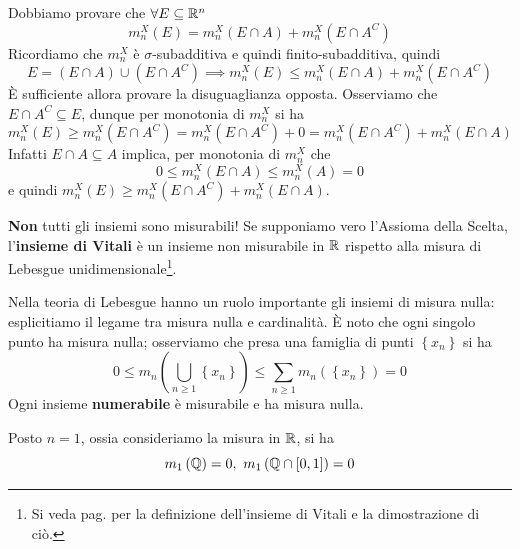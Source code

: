\begin{demonstration}
	Dobbiamo provare che $\forall E\subseteq \mathbb{R}^n$
	\begin{equation*}
		m_n^X(E)=m_n^X\left(E\cap A\right)+m_n^X\left(E\cap A^C\right)
	\end{equation*}
	Ricordiamo che $m_n^X$ è $\sigma$-subadditiva e quindi finito-subadditiva, quindi
	\begin{equation*}
		E=\left(E\cap A\right)\cup \left(E\cap A^C\right)\implies m_n^X(E)\leq m_n^X\left(E\cap A\right)+m_n^X\left(E\cap A^C\right)
	\end{equation*}
	È sufficiente allora provare la disuguaglianza opposta. Osserviamo che $E\cap A^C\subseteq E$, dunque per monotonia di $m_n^X$ si ha
	\begin{equation*}
		m_n^X(E)\geq m_n^X\left(E\cap A^C\right)=m_n^X\left(E\cap A^C\right)+0=m_n^X\left(E\cap A^C\right)+m_n^X\left(E\cap A\right)
	\end{equation*}
	Infatti $E\cap A\subseteq A$ implica, per monotonia di $m_n^X$ che
	\begin{equation*}
		0\leq m_n^X\left(E\cap A\right)\leq m_n^X\left(A\right)=0
	\end{equation*}
	e quindi $m_n^X(E)\geq m_n^X\left(E\cap A^C\right)+m_n^X\left(E\cap A\right)$.
\end{demonstration}
\begin{attention}
	\textbf{Non} tutti gli insiemi sono misurabili! Se supponiamo vero l'Assioma della Scelta, l'\textbf{insieme di Vitali} è un insieme non misurabile in $\mathbb{R}$ rispetto alla misura di Lebesgue unidimensionale\footnote{Si veda pag. \pageref{vitali} per la definizione dell'insieme di Vitali e la dimostrazione di ciò.}.
\end{attention}
Nella teoria di Lebesgue hanno un ruolo importante gli insiemi di misura nulla: esplicitiamo il legame tra misura nulla e cardinalità.
È noto che ogni singolo punto ha misura nulla; osserviamo che presa una famiglia di punti $\left\{x_n\right\}$ si ha
\begin{equation*}
	0\leq m_n\left(\bigcup_{n\geq 1}\left\{x_n\right\}\right)\leq \sum_{n\geq 1}m_n\left(\left\{x_n\right\}\right)=0
\end{equation*}
Ogni insieme \textbf{numerabile} è misurabile e ha misura nulla.
\begin{example}
	Posto $n=1$, ossia consideriamo la misura in $\mathbb{R}$, si ha
	\begin{equation*}
		m_1\left(\rationalset\right)=0,\ m_1\left(\rationalset\cap\left[0,1\right]\right)=0
	\end{equation*}
\end{example}
